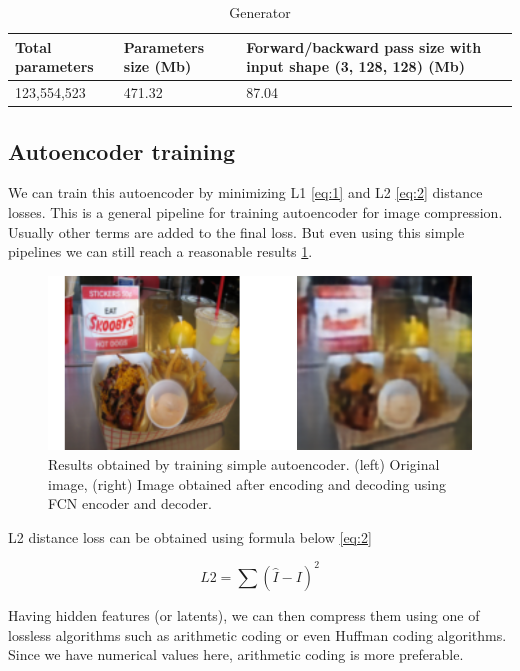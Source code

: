 \begin{table}
    \centering
    \caption{Generator}
    \label{tab:generator}
    \begin{tabular}{p{4cm}|p{4cm}|p{4cm}}
        \hline
        Total parameters & Parameters size (Mb) & Forward/backward pass size with input shape (3, 128, 128) (Mb) \\
        \hline
        123,554,523      & 471.32               & 87.04
    \end{tabular}
\end{table}

\subsection{Autoencoder training}

We can train this autoencoder by minimizing L1 \ref{eq:1} and L2 \ref{eq:2} distance losses. This is a general pipeline for training autoencoder for image compression. Usually other terms are added to the final loss. But even using this simple pipelines we can still reach a reasonable results \ref{autoencoder-result}.

\begin{figure}[!ht]
    \centering
    \includegraphics[width=\textwidth]{figure/autoencoder-result.png}
    \caption{Results obtained by training simple autoencoder. (left) Original image, (right) Image obtained after encoding and decoding  using FCN encoder and decoder.}
    \label{autoencoder-result}
\end{figure}

L2 distance loss can be obtained using formula below \ref{eq:2}

\begin{equation}
    \label{eq:2}
    L2=\sum (\hat{I}-I)^2
\end{equation}

Having hidden features (or latents), we can then compress them using one of lossless algorithms such as arithmetic coding or even Huffman coding algorithms. Since we have numerical values here, arithmetic coding is more preferable.

